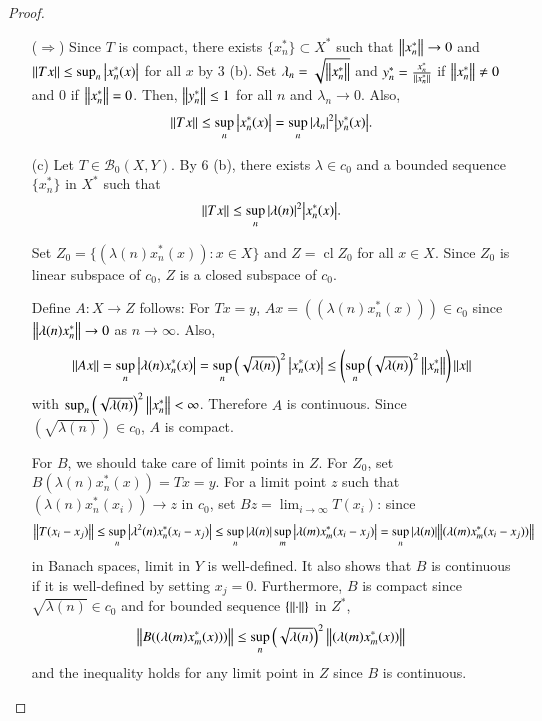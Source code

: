 \documentclass[a4paper, 12pt]{article}
\theoremstyle{Mydefinition}
\theoremstyle{Mytheorem}
\DeclareMathOperator{\cl}{cl}
\begin{document}
\begin{proof}
\begin{enumerate}
        ($\Rightarrow$) Since $T$ is compact, there exists $\{x^*_n\}\subset X^*$ such that $\norm{x^*_n}\rightarrow 0$ and $\norm{Tx}\leq \sup_n \abs{x^*_n(x)}$ for all $x$ by 3 (b). Set $\lambda_n = \sqrt{\norm{x^*_n}}$ and $y^*_n = \frac{x^*_n}{\norm{x^*_n}}$ if $\norm{x^*_n}\neq 0$ and $0$ if $\norm{x^*_n} = 0$. Then, $\norm{y^*_n} \leq 1$ for all $n$ and $\lambda_n\rightarrow 0$. Also,
        \begin{equation}
            \norm{Tx}\leq \sup_n \abs{x^*_n(x)} = \sup_n \abs{\lambda_n}^2 \abs{y^*_n(x)}.
        \end{equation}
        
        \item[(c)] Let $T\in \mathcal{B}_0(X,Y)$. By 6 (b), there exists $\lambda\in c_0$ and a bounded sequence $\{x_n^*\}$ in $X^*$ such that
        \begin{equation}
            \norm{Tx}\leq \sup_{n} \abs{\lambda(n)}^2 \abs{x_n^*(x)}.
        \end{equation}
        
        Set $Z_0 = \{(\lambda(n) x_n^*(x)):x\in X\}$ and $Z = \cl Z_0$ for all $x\in X$. Since $Z_0$ is linear subspace of $c_0$, $Z$ is a closed subspace of $c_0$.
        
        Define $A:X\rightarrow Z$ follows: For $Tx = y$, $Ax = ((\lambda(n)x_n^*(x)))\in c_0$ since $\norm{\lambda(n) x^*_n}\rightarrow 0$ as $n\rightarrow \infty$. Also,
        \begin{equation}
            \norm{Ax} = \sup_n \abs{\lambda(n) x_n^*(x)} = \sup_n \left(\sqrt{\lambda(n)}\right)^2 \abs{x_n^*(x)}\leq \left(\sup_n\left(\sqrt{\lambda(n)}\right)^2 \norm{x_n^*}\right)\norm{x}
        \end{equation}
        with $\sup_n\left(\sqrt{\lambda(n)}\right)^2 \norm{x_n^*}<\infty$. Therefore $A$ is continuous. Since $(\sqrt{\lambda(n)})\in c_0$, $A$ is compact.
        
        For $B$, we should take care of limit points in $Z$. For $Z_0$, set $B(\lambda(n) x_n^*(x)) = Tx = y$. For a limit point $z$ such that $(\lambda(n) x_n^*(x_i))\rightarrow z$ in $c_0$, set $Bz = \lim_{i\rightarrow \infty} T(x_i)$: since 
        \begin{equation}
            \norm{T(x_i-x_j)}\leq \sup_n \abs{\lambda^2(n) x_n^*(x_i-x_j)}\leq \sup_n \abs{\lambda(n)} \sup_m \abs{\lambda(m) x_m^*(x_i-x_j)}=\sup_n \abs{\lambda(n)} \norm{(\lambda(m)x_m^*(x_i-x_j))}
        \end{equation}
        in Banach spaces, limit in $Y$ is well-defined. It also shows that $B$ is continuous if it is well-defined by setting $x_j = 0$. Furthermore, $B$ is compact since $\sqrt{\lambda(n)}\in c_0$ and for bounded sequence $\{\norm{\cdot}\}$ in $Z^*$,
        \begin{equation}
            \norm{B((\lambda(m) x_m^*(x)))} \leq \sup_{n} \left(\sqrt{\lambda(n)}\right)^2 \norm{(\lambda(m)x_m^*(x))}
        \end{equation}
        and the inequality holds for any limit point in $Z$ since $B$ is continuous.
        

\end{enumerate}
\end{proof}
\end{document}
